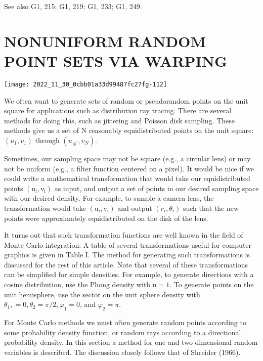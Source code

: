 \begin{CJK}{UTF8}{gbsn}
See also G1, 215; G1, 219; G1, 233; G1, 249.

\section{NONUNIFORM RANDOM POINT SETS VIA WARPING}
\begin{center}
\texttt{[image: 2022\_11\_30\_0cbb01a33d99487fc27fg-112]}
\end{center}

We often want to generate sets of random or pseudorandom points on the unit square for applications such as distribution ray tracing. There are several methods for doing this, such as jittering and Poisson disk sampling. These methods give us a set of $\mathrm{N}$ reasonably equidistributed points on the unit square: $\left(u_{1}, v_{1}\right)$ through $\left(u_{N^{\prime}}, v_{N}\right)$.

Sometimes, our sampling space may not be square (e.g., a circular lens) or may not be uniform (e.g., a filter function centered on a pixel). It would be nice if we could write a mathematical transformation that would take our equidistributed points $\left(\mathrm{u}_{\mathrm{i}}, \mathrm{v}_{\mathrm{i}}\right)$ as input, and output a set of points in our desired sampling space with our desired density. For example, to sample a camera lens, the transformation would take $\left(\mathrm{u}_{\mathrm{i}}, \mathrm{v}_{\mathrm{i}}\right)$ and output $\left(r_{i}, \theta_{i}\right)$ such that the new points were approximately equidistributed on the disk of the lens.

It turns out that such transformation functions are well known in the field of Monte Carlo integration. A table of several transformations useful for computer graphics is given in Table I. The method for generating such transformations is discussed for the rest of this article. Note that several of these transformations can be simplified for simple densities. For example, to generate directions with a cosine distribution, use the Phong density with $\mathrm{n}=1$. To generate points on the unit hemisphere, use the sector on the unit sphere density with $\theta_{1},=0, \theta_{2}=\pi / 2, \varphi_{1}=0$, and $\varphi_{2}=\pi$.

For Monte Carlo methods we must often generate random points according to some probability density function, or random rays according to a directional probability density. In this section a method for one and two dimensional random variables is described. The discussion closely follows that of Shreider (1966).


\end{CJK}
